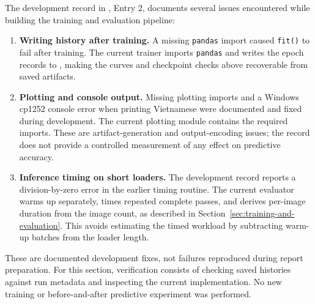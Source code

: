 The development record in , Entry 2, documents several issues encountered while building the training and evaluation pipeline:
\begin{enumerate}
    \item \textbf{Writing history after training.} A missing \texttt{pandas} import caused \texttt{fit()} to fail after training. The current trainer imports \texttt{pandas} and writes the epoch records to , making the curves and checkpoint checks above recoverable from saved artifacts.
    \item \textbf{Plotting and console output.} Missing plotting imports and a Windows cp1252 console error when printing Vietnamese were documented and fixed during development. The current plotting module contains the required imports. These are artifact-generation and output-encoding issues; the record does not provide a controlled measurement of any effect on predictive accuracy.
    \item \textbf{Inference timing on short loaders.} The development record reports a division-by-zero error in the earlier timing routine. The current evaluator warms up separately, times repeated complete passes, and derives per-image duration from the image count, as described in Section~\ref{sec:training-and-evaluation}. This avoids estimating the timed workload by subtracting warm-up batches from the loader length.
\end{enumerate}

These are documented development fixes, not failures reproduced during report preparation. For this section, verification consists of checking saved histories against run metadata and inspecting the current implementation. No new training or before-and-after predictive experiment was performed.
